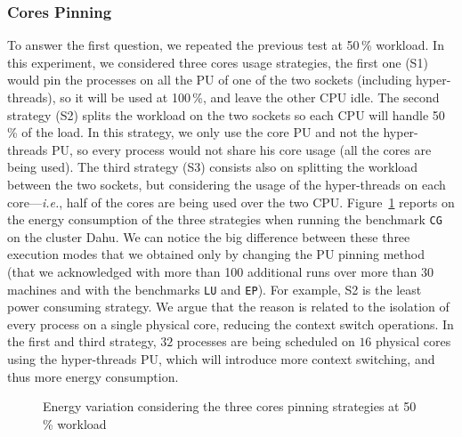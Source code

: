 \subsubsection{Cores Pinning}
To answer the first question, we repeated the previous test at 50\,\% workload.
In this experiment, we considered three cores usage strategies, the first one (\textsf{S1}) would pin the processes on all the PU of one of the two sockets (including hyper-threads), so it will be used at 100\,\%, and leave the other CPU idle.
The second strategy (\textsf{S2}) splits the workload on the two sockets so each CPU will handle 50\,\% of the load.
In this strategy, we only use the core PU and not the hyper-threads PU, so every process would not share his core usage (all the cores are being used).
The third strategy (\textsf{S3}) consists also on splitting the workload between the two sockets, but considering the usage of the hyper-threads on each core---\emph{i.e.}, half of the cores are being used over the two CPU.
Figure~\ref{fig:cores-pinning} reports on the energy consumption of the three strategies when running the benchmark \texttt{CG} on the cluster \textsf{Dahu}.
We can notice the big difference between these three execution modes that we obtained only by changing the PU pinning method (that we acknowledged with more than 100 additional runs over more than 30 machines and with the benchmarks \texttt{LU} and \texttt{EP}).
For example, \textsf{S2} is the least power consuming strategy.
We argue that the reason is related to the isolation of every process on a single physical core, reducing the context switch operations.
In the first and third strategy, $32$ processes are being scheduled on $16$ physical cores using the hyper-threads PU, which will introduce more context switching, and thus more energy consumption.

\begin{figure}
    \caption{Energy variation considering the three cores pinning strategies at 50\,\% workload}\label{fig:cores-pinning}
\end{figure}

